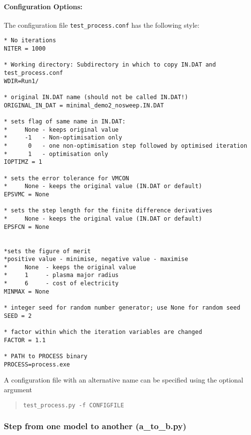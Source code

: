 \documentclass[11pt,a4paper]{article}
\begin{document}
\paragraph{Configuration Options:}

The configuration file \texttt{test\_process.conf} has the following style:
\begin{framed}
\begin{verbatim}
* No iterations
NITER = 1000

* Working directory: Subdirectory in which to copy IN.DAT and test_process.conf
WDIR=Run1/

* original IN.DAT name (should not be called IN.DAT!)
ORIGINAL_IN_DAT = minimal_demo2_nosweep.IN.DAT

* sets flag of same name in IN.DAT:
*     None - keeps original value
*     -1   - Non-optimisation only
*      0   - one non-optimisation step followed by optimised iteration
*      1   - optimisation only
IOPTIMZ = 1

* sets the error tolerance for VMCON
*     None - keeps the original value (IN.DAT or default)
EPSVMC = None

* sets the step length for the finite difference derivatives
*     None - keeps the original value (IN.DAT or default)
EPSFCN = None


*sets the figure of merit
*positive value - minimise, negative value - maximise
*     None  - keeps the original value
*     1     - plasma major radius
*     6	    - cost of electricity
MINMAX = None

* integer seed for random number generator; use None for random seed
SEED = 2

* factor within which the iteration variables are changed
FACTOR = 1.1

* PATH to PROCESS binary
PROCESS=process.exe
\end{verbatim}
\end{framed}

A configuration file with an alternative name can be specified using the optional argument
\begin{quote}
\begin{verbatim}
test_process.py -f CONFIGFILE
\end{verbatim}
\end{quote}


\subsubsection{Step from one model to another (a\_to\_b.py)}
\label{sec:atob}
\end{document}
